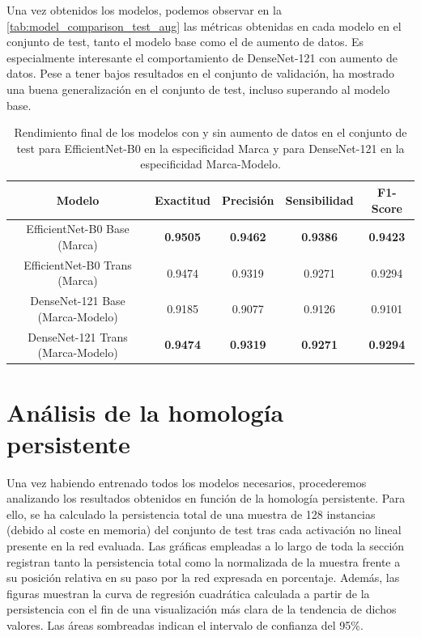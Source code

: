Una vez obtenidos los modelos, podemos observar en la \autoref{tab:model_comparison_test_aug}
las métricas obtenidas en cada modelo en el conjunto de test, tanto el modelo
base como el de aumento de datos. Es especialmente interesante el comportamiento
de DenseNet-121 con aumento de datos. Pese a tener bajos resultados en el
conjunto de validación, ha mostrado una buena generalización en el conjunto de test,
incluso superando al modelo base.

\begin{table}[H]
	\centering
	\begin{adjustbox}
		{width=0.85\textwidth}
		\begin{tabular}{|c|c|c|c|c|}
			\hline
			\textbf{Modelo}                   & \textbf{Exactitud} & \textbf{Precisión} & \textbf{Sensibilidad} & \textbf{F1-Score} \\
			\hline
			EfficientNet-B0 Base (Marca)      & \textbf{0.9505}    & \textbf{0.9462}    & \textbf{0.9386}       & \textbf{0.9423}   \\
			\hline
			EfficientNet-B0 Trans (Marca)     & 0.9474             & 0.9319             & 0.9271                & 0.9294            \\
			\hline
			\hline
			DenseNet-121 Base (Marca-Modelo)  & 0.9185             & 0.9077             & 0.9126                & 0.9101            \\
			\hline
			DenseNet-121 Trans (Marca-Modelo) & \textbf{0.9474}    & \textbf{0.9319}    & \textbf{0.9271}       & \textbf{0.9294}   \\
			\hline
		\end{tabular}
	\end{adjustbox}
	\caption{Rendimiento final de los modelos con y sin aumento de datos en el
		conjunto de test para EfficientNet-B0 en la especificidad Marca y para
		DenseNet-121 en la especificidad Marca-Modelo.}
	\label{tab:model_comparison_test_aug}
\end{table}

\section{Análisis de la homología persistente}
\label{sec:homology-analysis}

Una vez habiendo entrenado todos los modelos necesarios, procederemos analizando
los resultados obtenidos en función de la homología persistente. Para ello, se ha
calculado la persistencia total de una muestra de 128 instancias (debido al
coste en memoria) del conjunto de test tras cada activación no lineal presente en
la red evaluada. Las gráficas empleadas a lo largo de toda la sección registran
tanto la persistencia total como la normalizada de la muestra frente a su
posición relativa en su paso por la red expresada en porcentaje. Además, las
figuras muestran la curva de regresión cuadrática calculada a partir de la
persistencia con el fin de una visualización más clara de la tendencia de dichos
valores. Las áreas sombreadas indican el intervalo de confianza del 95\%.

